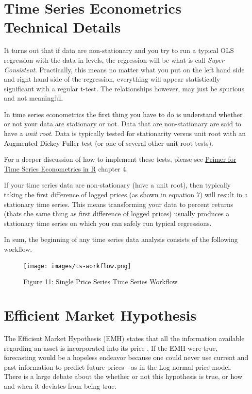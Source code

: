 \documentclass[
]{book}
\begin{document}
\hypertarget{time-series-econometrics-technical-details}{%
\section{Time Series Econometrics Technical Details}\label{time-series-econometrics-technical-details}}

It turns out that if data are non-stationary and you try to run a typical OLS regression with the data in levels, the regression will be what is call \emph{Super Consistent}. Practically, this means no matter what you put on the left hand side and right hand side of the regression, everything will appear statistically significant with a regular t-test. The relationships however, may just be spurious and not meaningful.

In time series econometrics the first thing you have to do is understand whether or not your data are stationary or not. Data that are non-stationary are said to have a \emph{unit root}. Data is typically tested for stationarity versus unit root with an Augmented Dickey Fuller test (or one of several other unit root tests).

For a deeper discussion of how to implement these tests, please see \href{http://mindymallory.com/R-Companion-Price-Analysis/}{Primer for Time Series Econometrics in R} chapter 4.

If your time series data are non-stationary (have a unit root), then typically taking the first difference of logged prices (as shown in equation 7) will result in a stationary time series. This means transforming your data to percent returns (thats the same thing as first difference of logged prices) usually produces a stationary time series on which you can safely run typical regressions.

In sum, the beginning of any time series data analysis consists of the following workflow.

\begin{figure}
\centering
\texttt{[image: images/ts-workflow.png]}
\caption{Figure 11: Single Price Series Time Series Workflow}
\end{figure}

\hypertarget{efficient-market-hypothesis}{%
\section{Efficient Market Hypothesis}\label{efficient-market-hypothesis}}

The Efficient Market Hypothesis (EMH) states that all the information available regarding an asset is incorporated into its price \citep{fama1970}. If the EMH were true, forecasting would be a hopeless endeavor because one could never use current and past information to predict future prices - as in the Log-normal price model. There is a large debate about the whether or not this hypothesis is true, or how and when it deviates from being true.
\end{document}
